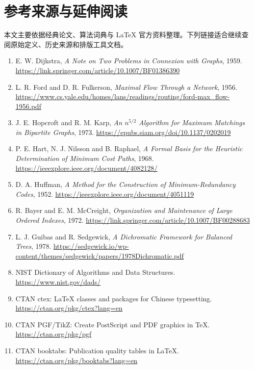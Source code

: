 \documentclass[UTF8,oneside,12pt]{ctexbook}
\begin{document}
\chapter*{参考来源与延伸阅读}
本文主要依据经典论文、算法词典与 LaTeX 官方资料整理。下列链接适合继续查阅原始定义、历史来源和排版工具文档。
\begin{enumerate}
\item E. W. Dijkstra, \textit{A Note on Two Problems in Connexion with Graphs}, 1959. \url{https://link.springer.com/article/10.1007/BF01386390}
\item L. R. Ford and D. R. Fulkerson, \textit{Maximal Flow Through a Network}, 1956. \url{https://www.cs.yale.edu/homes/lans/readings/routing/ford-max_flow-1956.pdf}
\item J. E. Hopcroft and R. M. Karp, \textit{An $n^{5/2}$ Algorithm for Maximum Matchings in Bipartite Graphs}, 1973. \url{https://epubs.siam.org/doi/10.1137/0202019}
\item P. E. Hart, N. J. Nilsson and B. Raphael, \textit{A Formal Basis for the Heuristic Determination of Minimum Cost Paths}, 1968. \url{https://ieeexplore.ieee.org/document/4082128/}
\item D. A. Huffman, \textit{A Method for the Construction of Minimum-Redundancy Codes}, 1952. \url{https://ieeexplore.ieee.org/document/4051119}
\item R. Bayer and E. M. McCreight, \textit{Organization and Maintenance of Large Ordered Indexes}, 1972. \url{https://link.springer.com/article/10.1007/BF00288683}
\item L. J. Guibas and R. Sedgewick, \textit{A Dichromatic Framework for Balanced Trees}, 1978. \url{https://sedgewick.io/wp-content/themes/sedgewick/papers/1978Dichromatic.pdf}
\item NIST Dictionary of Algorithms and Data Structures. \url{https://www.nist.gov/dads/}
\item CTAN ctex: LaTeX classes and packages for Chinese typesetting. \url{https://ctan.org/pkg/ctex?lang=en}
\item CTAN PGF/TikZ: Create PostScript and PDF graphics in TeX. \url{https://ctan.org/pkg/pgf}
\item CTAN booktabs: Publication quality tables in LaTeX. \url{https://ctan.org/pkg/booktabs?lang=en}
\end{enumerate}
\end{document}
